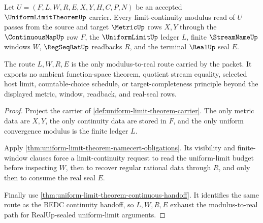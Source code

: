 \begin{theorem}
\label{thm:uniform-limit-theorem-regular-cauchy-modulus-handoff}
Let $U=(F,L,W,R,E,X,Y,H,C,P,N)$ be an accepted $\UniformLimitTheoremUp$ carrier. Every limit-continuity modulus read of $U$ passes from the source and target $\MetricUp$ rows $X,Y$ through the $\ContinuousMapUp$ row $F$, the $\UniformLimitUp$ ledger $L$, finite $\StreamNameUp$ windows $W$, $\RegSeqRatUp$ readbacks $R$, and the terminal $\RealUp$ seal $E$.

The route $L,W,R,E$ is the only modulus-to-real route carried by the packet. It exports no ambient function-space theorem, quotient stream equality, selected host limit, countable-choice schedule, or target-completeness principle beyond the displayed metric, window, readback, and real-seal rows.
\end{theorem}
\begin{proof}
Project the carrier of \autoref{def:uniform-limit-theorem-carrier}. The only metric data are $X,Y$, the only continuity data are stored in $F$, and the only uniform convergence modulus is the finite ledger $L$.

Apply \autoref{thm:uniform-limit-theorem-namecert-obligations}. Its visibility and finite-window clauses force a limit-continuity request to read the uniform-limit budget before inspecting $W$, then to recover regular rational data through $R$, and only then to consume the real seal $E$.

Finally use \autoref{thm:uniform-limit-theorem-continuous-handoff}. It identifies the same route as the BEDC continuity handoff, so $L,W,R,E$ exhaust the modulus-to-real path for RealUp-sealed uniform-limit arguments.
\end{proof}


\begin{closurestatus}{\UniformLimitTheoremUp}
  \theoryclosure{\seedClosure}
  \formalstatus{\unformalizedV}
\end{closurestatus}
